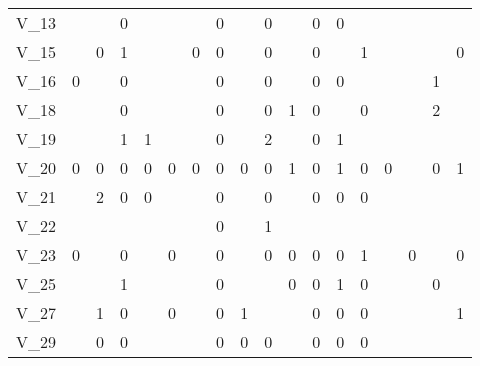 \begin{tabular}{llllllllllllllllll}
V\_13   &         &            &          0 &       &       &         &     0 &            &     0 &      &    0 &          0 &        &       &       &           &                \\
V\_15   &         &          0 &          1 &       &       &       0 &     0 &            &     0 &      &    0 &            &      1 &       &       &           &              0 \\
V\_16   &       0 &            &          0 &       &       &         &     0 &            &     0 &      &    0 &          0 &        &       &       &         1 &                \\
V\_18   &         &            &          0 &       &       &         &     0 &            &     0 &    1 &    0 &            &      0 &       &       &         2 &                \\
V\_19   &         &            &          1 &     1 &       &         &     0 &            &     2 &      &    0 &          1 &        &       &       &           &                \\
V\_20   &       0 &          0 &          0 &     0 &     0 &       0 &     0 &          0 &     0 &    1 &    0 &          1 &      0 &     0 &       &         0 &              1 \\
V\_21   &         &          2 &          0 &     0 &       &         &     0 &            &     0 &      &    0 &          0 &      0 &       &       &           &                \\
V\_22   &         &            &            &       &       &         &     0 &            &     1 &      &      &            &        &       &       &           &                \\
V\_23   &       0 &            &          0 &       &     0 &         &     0 &            &     0 &    0 &    0 &          0 &      1 &       &     0 &           &              0 \\
V\_25   &         &            &          1 &       &       &         &     0 &            &       &    0 &    0 &          1 &      0 &       &       &         0 &                \\
V\_27   &         &          1 &          0 &       &     0 &         &     0 &          1 &       &      &    0 &          0 &      0 &       &       &           &              1 \\
V\_29   &         &          0 &          0 &       &       &         &     0 &          0 &     0 &      &    0 &          0 &      0 &       &       &           &                \\

\end{tabular}
